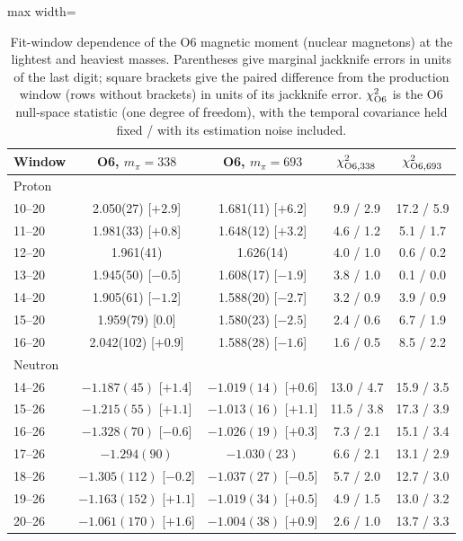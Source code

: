\documentclass[aps,prd,preprint,nofootinbib,floatfix]{revtex4-2}
\begin{document}
\begin{table}[t]
\caption{Fit-window dependence of the O6 magnetic moment (nuclear magnetons) at the lightest and heaviest masses. Parentheses give marginal jackknife errors in units of the last digit; square brackets give the paired difference from the production window (rows without brackets) in units of its jackknife error. $\chi^2_{\rm O6}$ is the O6 null-space statistic (one degree of freedom), with the temporal covariance held fixed / with its estimation noise included.}
\label{tab:windows}
\centering
\begin{adjustbox}{max width=\columnwidth}
\begin{tabular}{lcccc}
\toprule
Window & O6, $m_\pi=338$ & O6, $m_\pi=693$ & $\chi^2_{{\rm O6},338}$ & $\chi^2_{{\rm O6},693}$\\
\midrule
\multicolumn{5}{l}{Proton}\\
10--20 & 2.050(27) [$+2.9$] & 1.681(11) [$+6.2$] & 9.9 / 2.9 & 17.2 / 5.9\\
11--20 & 1.981(33) [$+0.8$] & 1.648(12) [$+3.2$] & 4.6 / 1.2 & 5.1 / 1.7\\
12--20 & 1.961(41) & 1.626(14) & 4.0 / 1.0 & 0.6 / 0.2\\
13--20 & 1.945(50) [$-0.5$] & 1.608(17) [$-1.9$] & 3.8 / 1.0 & 0.1 / 0.0\\
14--20 & 1.905(61) [$-1.2$] & 1.588(20) [$-2.7$] & 3.2 / 0.9 & 3.9 / 0.9\\
15--20 & 1.959(79) [$0.0$] & 1.580(23) [$-2.5$] & 2.4 / 0.6 & 6.7 / 1.9\\
16--20 & 2.042(102) [$+0.9$] & 1.588(28) [$-1.6$] & 1.6 / 0.5 & 8.5 / 2.2\\
\multicolumn{5}{l}{Neutron}\\
14--26 & $-1.187(45)$ [$+1.4$] & $-1.019(14)$ [$+0.6$] & 13.0 / 4.7 & 15.9 / 3.5\\
15--26 & $-1.215(55)$ [$+1.1$] & $-1.013(16)$ [$+1.1$] & 11.5 / 3.8 & 17.3 / 3.9\\
16--26 & $-1.328(70)$ [$-0.6$] & $-1.026(19)$ [$+0.3$] & 7.3 / 2.1 & 15.1 / 3.4\\
17--26 & $-1.294(90)$ & $-1.030(23)$ & 6.6 / 2.1 & 13.1 / 2.9\\
18--26 & $-1.305(112)$ [$-0.2$] & $-1.037(27)$ [$-0.5$] & 5.7 / 2.0 & 12.7 / 3.0\\
19--26 & $-1.163(152)$ [$+1.1$] & $-1.019(34)$ [$+0.5$] & 4.9 / 1.5 & 13.0 / 3.2\\
20--26 & $-1.061(170)$ [$+1.6$] & $-1.004(38)$ [$+0.9$] & 2.6 / 1.0 & 13.7 / 3.3\\
\bottomrule
\end{tabular}
\end{adjustbox}
\end{table}
\end{document}
